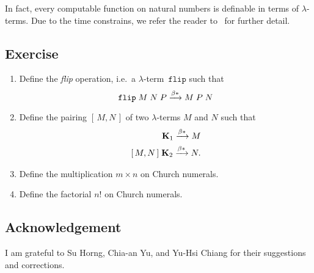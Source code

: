 In fact, every computable function on natural numbers is definable in terms of
$\lambda$-terms. Due to the time constrains, we refer the reader
to~\cite[Chapter 3]{Barendregt1984} for further detail.
\subsection*{Exercise}
\begin{enumerate}
  \item Define the \emph{flip} operation, i.e.\ a $\lambda$-term~$\mathtt{flip}$
    such that
    \[
      \mathtt{flip}\;M\;N\;P
      \xrightarrow{\beta*} M\;P\;N
    \]
  \item Define the pairing $[\,M, N\,]$ of two $\lambda$-terms $M$ and $N$
    such that
    \begin{align*}
      [\,M, N\,]\;\mathbf{K}_1 \reduce M \\
      [\,M, N\,]\;\mathbf{K}_2 \reduce N.
    \end{align*}
  \item Define the multiplication $m \times n$ on Church numerals.
  \item Define the factorial $n!$ on Church numerals.
\end{enumerate}

\subsection*{Acknowledgement}
  I am grateful to Su Horng, Chia-an Yu, and Yu-Hsi Chiang for their suggestions
  and corrections.


 


